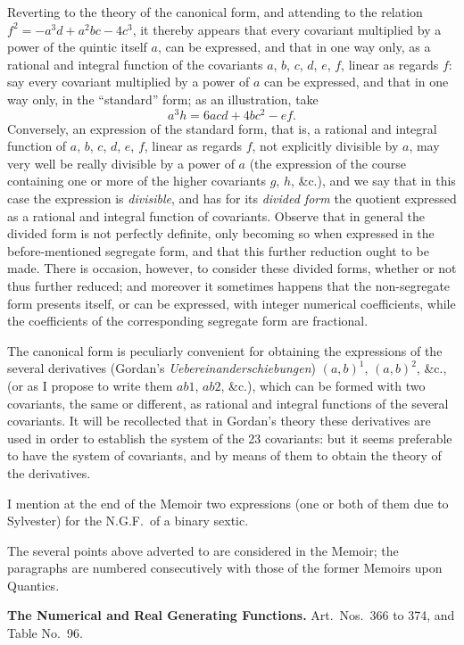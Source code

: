 \documentclass[11pt,a4paper]{book}
\begin{document}
Reverting to the theory of the canonical form, and attending to the relation $f^2 = -a^3 d + a^2 bc - 4c^3$, it thereby appears that every covariant multiplied by a power of the quintic itself $a$, can be expressed, and that in one way only, as a rational and integral function of the covariants $a$, $b$, $c$, $d$, $e$, $f$, linear as regards $f$: say every covariant multiplied by a power of $a$ can be expressed, and that in one way only, in the ``standard'' form; as an illustration, take
\[
a^3 h = 6acd + 4bc^2 - ef.
\]
Conversely, an expression of the standard form, that is, a rational and integral function of $a$, $b$, $c$, $d$, $e$, $f$, linear as regards $f$, not explicitly divisible by $a$, may very well be really divisible by a power of $a$ (the expression of the course containing one or more of the higher covariants $g$, $h$, \&c.), and we say that in this case the expression is \textit{divisible}, and has for its \textit{divided form} the quotient expressed as a rational and integral function of covariants. Observe that in general the divided form is not perfectly definite, only becoming so when expressed in the before-mentioned segregate form, and that this further reduction ought to be made. There is occasion, however, to consider these divided forms, whether or not thus further reduced; and moreover it sometimes happens that the non-segregate form presents itself, or can be expressed, with integer numerical coefficients, while the coefficients of the corresponding segregate form are fractional.

The canonical form is peculiarly convenient for obtaining the expressions of the several derivatives (Gordan's \textit{Uebereinanderschiebungen}) $(a, b)^1$, $(a, b)^2$, \&c., (or as I propose to write them $ab1$, $ab2$, \&c.), which can be formed with two covariants, the same or different, as rational and integral functions of the several covariants. It will be recollected that in Gordan's theory these derivatives are used in order to establish the system of the 23 covariants: but it seems preferable to have the system of covariants, and by means of them to obtain the theory of the derivatives.

I mention at the end of the Memoir two expressions (one or both of them due to Sylvester) for the N.G.F.\ of a binary sextic.

The several points above adverted to are considered in the Memoir; the paragraphs are numbered consecutively with those of the former Memoirs upon Quantics.

\bigskip
\noindent\textbf{The Numerical and Real Generating Functions.} Art.\ Nos.\ 366 to 374, and Table No.~96.
\end{document}
